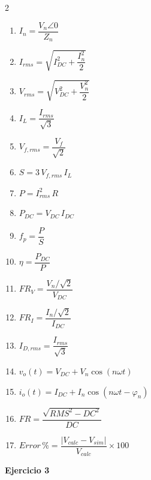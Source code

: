 \documentclass[9pt]{extarticle}
\begin{document}
\begin{multicols}{2}
\begin{enumerate}
\item $I_n = \dfrac{V_n\angle 0}{Z_n}$
\item $I_{rms} = \sqrt{I_{DC}^2 + \dfrac{I_n^2}{2}}$
\item $V_{rms} = \sqrt{V_{DC}^2 + \dfrac{V_n^2}{2}}$
\item $I_L = \dfrac{I_{rms}}{\sqrt{3}}$
\item $V_{f,rms} = \dfrac{V_f}{\sqrt{2}}$
\item $S = 3\,V_{f,rms}\,I_L$
\item $P = I_{rms}^2\,R$
\item $P_{DC} = V_{DC}\,I_{DC}$
\item $f_p = \dfrac{P}{S}$
\item $\eta = \dfrac{P_{DC}}{P}$
\item $FR_V = \dfrac{V_n/\sqrt{2}}{V_{DC}}$
\item $FR_I = \dfrac{I_n/\sqrt{2}}{I_{DC}}$
\item $I_{D,rms} = \dfrac{I_{rms}}{\sqrt{3}}$
\item $v_o(t) = V_{DC} + V_n\cos(n\omega t)$
\item $i_o(t) = I_{DC} + I_n\cos(n\omega t - \varphi_n)$
\item $FR = \dfrac{\sqrt{RMS^2 - DC^2}}{DC}$
\item $Error\,\% = \dfrac{|V_{calc} - V_{sim}|}{V_{calc}}\times 100$
\end{enumerate}

\vspace{4pt}
\textbf{Ejercicio 3}


\end{multicols}
\end{document}
